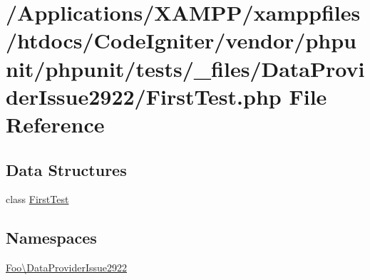 \hypertarget{_data_provider_issue2922_2_first_test_8php}{}\section{/\+Applications/\+X\+A\+M\+P\+P/xamppfiles/htdocs/\+Code\+Igniter/vendor/phpunit/phpunit/tests/\+\_\+files/\+Data\+Provider\+Issue2922/\+First\+Test.php File Reference}
\label{_data_provider_issue2922_2_first_test_8php}
\subsection*{Data Structures}
\begin{DoxyCompactItemize}
\item 
class \mbox{\hyperlink{class_foo_1_1_data_provider_issue2922_1_1_first_test}{First\+Test}}
\end{DoxyCompactItemize}
\subsection*{Namespaces}
\begin{DoxyCompactItemize}
\item 
 \mbox{\hyperlink{namespace_foo_1_1_data_provider_issue2922}{Foo\textbackslash{}\+Data\+Provider\+Issue2922}}
\end{DoxyCompactItemize}
